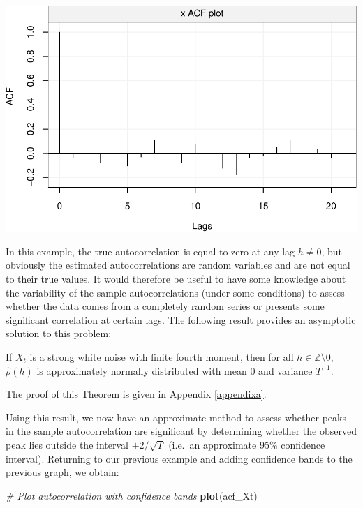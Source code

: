 \documentclass[]{book}
\newenvironment{Shaded}{\begin{snugshade}}{\end{snugshade}}
\newcommand{\CommentTok}[1]{\textcolor[rgb]{0.56,0.35,0.01}{\textit{#1}}}
\newcommand{\KeywordTok}[1]{\textcolor[rgb]{0.13,0.29,0.53}{\textbf{#1}}}
\newcommand{\NormalTok}[1]{#1}
\theoremstyle{definition}
\theoremstyle{definition}
\theoremstyle{definition}
\theoremstyle{remark}
\let\BeginKnitrBlock\begin \let\EndKnitrBlock\end
\begin{document}
\includegraphics{ts_files/figure-latex/basicACF-1.pdf}

In this example, the true autocorrelation is equal to zero at any lag
\(h \neq 0\), but obviously the estimated autocorrelations are random
variables and are not equal to their true values. It would therefore be
useful to have some knowledge about the variability of the sample
autocorrelations (under some conditions) to assess whether the data
comes from a completely random series or presents some significant
correlation at certain lags. The following result provides an asymptotic
solution to this problem:

\BeginKnitrBlock{theorem}
\protect\hypertarget{thm:approxnormal}{}{\label{thm:approxnormal} }If
\(X_t\) is a strong white noise with finite fourth moment, then for all
\(h \in \mathbb{Z} \setminus {0}\), \(\hat{\rho}(h)\) is approximately
normally distributed with mean \(0\) and variance \(T^{-1}\).
\EndKnitrBlock{theorem}

The proof of this Theorem is given in Appendix \ref{appendixa}.

Using this result, we now have an approximate method to assess whether
peaks in the sample autocorrelation are significant by determining
whether the observed peak lies outside the interval \(\pm 2/\sqrt{T}\)
(i.e.~an approximate 95\% confidence interval). Returning to our
previous example and adding confidence bands to the previous graph, we
obtain:

\begin{Shaded}
\begin{Highlighting}[]
\CommentTok{# Plot autocorrelation with confidence bands }
\KeywordTok{plot}\NormalTok{(acf_Xt)}
\end{Highlighting}
\end{Shaded}
\end{document}
